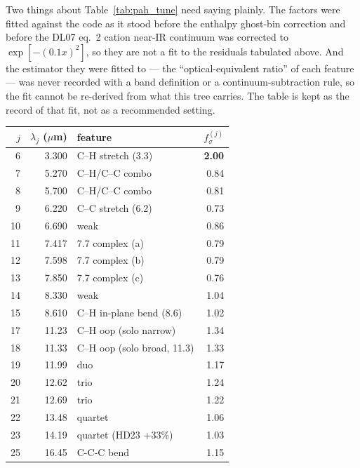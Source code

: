 \documentclass{my_memo}
\begin{document}
Two things about Table~\ref{tab:pah_tune} need saying plainly. The
factors were fitted against the code as it stood before the enthalpy
ghost-bin correction and before the DL07 eq.~2 cation near-IR continuum
was corrected to $\exp[-(0.1x)^2]$, so they are not a fit to the
residuals tabulated above. And the estimator they were fitted to --- the
``optical-equivalent ratio'' of each feature --- was never recorded
with a band definition or a continuum-subtraction rule, so the fit
cannot be re-derived from what this tree carries. The table is kept as
the record of that fit, not as a recommended setting.

\begin{table}[h]
\centering
\small
\begin{tabular}{r r l r}
\toprule
$j$ & $\lambda_j$ ($\mu$m) & feature                  & $f^{(j)}_\sigma$ \\
\midrule
  6 & 3.300  & C--H stretch (3.3)              & \textbf{2.00} \\
  7 & 5.270  & C--H/C--C combo                 & 0.84 \\
  8 & 5.700  & C--H/C--C combo                 & 0.81 \\
  9 & 6.220  & C--C stretch (6.2)              & 0.73 \\
 10 & 6.690  & weak                            & 0.86 \\
 11 & 7.417  & 7.7 complex (a)                 & 0.79 \\
 12 & 7.598  & 7.7 complex (b)                 & 0.79 \\
 13 & 7.850  & 7.7 complex (c)                 & 0.76 \\
 14 & 8.330  & weak                            & 1.04 \\
 15 & 8.610  & C--H in-plane bend (8.6)        & 1.02 \\
 17 & 11.23  & C--H oop (solo narrow)          & 1.34 \\
 18 & 11.33  & C--H oop (solo broad, 11.3)     & 1.33 \\
 19 & 11.99  & duo                             & 1.17 \\
 20 & 12.62  & trio                            & 1.24 \\
 21 & 12.69  & trio                            & 1.22 \\
 22 & 13.48  & quartet                         & 1.06 \\
 23 & 14.19  & quartet (HD23 +33\%)            & 1.03 \\
 25 & 16.45  & C-C-C bend                      & 1.15 \\

\end{tabular}
\end{table}
\end{document}
